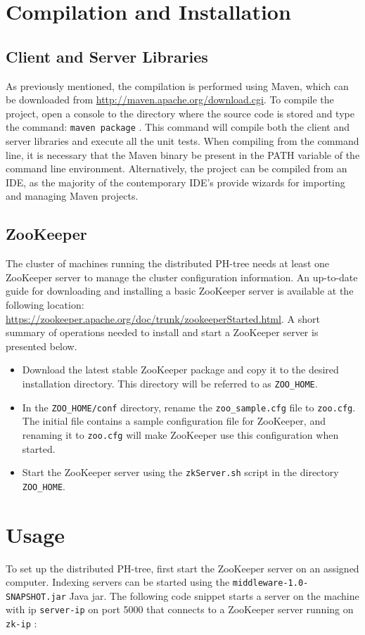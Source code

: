 \documentclass[11pt,a4paper]{globis-book}
\begin{document}
\section{Compilation and Installation} 

\subsection{Client and Server Libraries}
As previously mentioned, the compilation is performed using Maven, which can be downloaded from \url{http://maven.apache.org/download.cgi}. To compile the project, open a console to the directory where the source code is stored and type the command: \texttt{maven package} . This command will compile both the client and server libraries and execute all the unit tests. When compiling from the command line, it is necessary that the Maven binary be present in the PATH variable of the command line environment. Alternatively, the project can be compiled from an IDE, as the majority of the contemporary IDE's provide wizards for importing and managing Maven projects.

\subsection{ZooKeeper}
The cluster of machines running the distributed PH-tree needs at least one ZooKeeper server to manage the cluster configuration information. An up-to-date guide for downloading and installing a basic ZooKeeper server is available at the following location: \url{https://zookeeper.apache.org/doc/trunk/zookeeperStarted.html}. 
A short summary of operations needed to install and start a ZooKeeper server is presented below.
\begin{itemize}
    \item Download the latest stable ZooKeeper package and copy it to the desired installation directory. This directory will be referred to as \texttt{ZOO\_HOME}.
    \item In the \texttt{ZOO\_HOME/conf} directory, rename the \texttt{zoo\_sample.cfg} file to \texttt{zoo.cfg}. The initial file contains a sample configuration file for ZooKeeper, and renaming it to \texttt{zoo.cfg} will make ZooKeeper use this configuration when started.
    \item Start the ZooKeeper server using the \texttt{zkServer.sh} script in the directory \texttt{ZOO\_HOME}.
\end{itemize}

\section{Usage}
To set up the distributed PH-tree, first start the ZooKeeper server on an assigned computer. Indexing servers can be started using the \texttt{middleware-1.0-SNAPSHOT.jar} Java jar.
The following code snippet starts a server on the machine with ip \texttt{server-ip} on port 5000 that connects to a ZooKeeper server running on \texttt{zk-ip} : 
\end{document}
